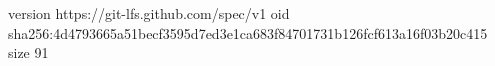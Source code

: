 version https://git-lfs.github.com/spec/v1
oid sha256:4d4793665a51becf3595d7ed3e1ca683f84701731b126fcf613a16f03b20c415
size 91
